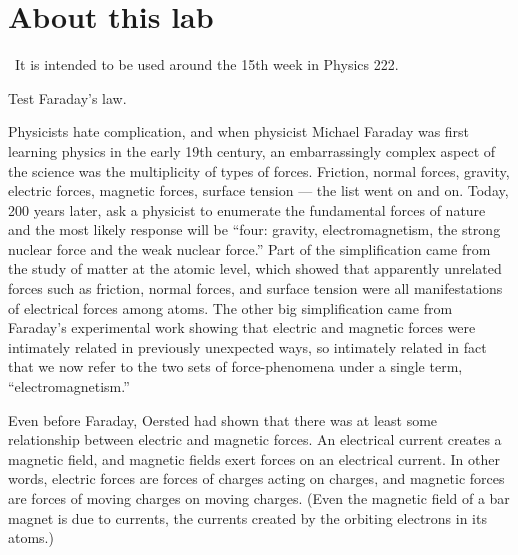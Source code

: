 \renewcommand\thechapter{c2.15}
\label{lab:faraday}

\section*{About this lab}

\covid\ 
It is intended to be used around the 15th week in Physics 222.

\apparatus
{}


\begin{goals}

\item[] Test Faraday's law.
\end{goals}

\introduction

Physicists hate complication, and when physicist Mi\-ch\-a\-el
Faraday was first learning physics in the early 19th
century, an embarrassingly complex aspect of the science was
the multiplicity of types of forces. Friction, normal
forces, gravity, electric forces, magnetic forces, surface
tension --- the list went on and on. Today, 200 years later,
ask a physicist to enumerate the fundamental forces of
nature and the most likely response will be ``four: gravity,
electromagnetism, the strong nuclear force and the weak
nuclear force.'' Part of the simplification came from the
study of matter at the atomic level, which showed that
apparently unrelated forces such as friction, normal forces,
and surface tension were all manifestations of electrical
forces among atoms. The other big simplification came from
Faraday's experimental work showing that electric and
magnetic forces were intimately related in previously
unexpected ways, so intimately related in fact that we now
refer to the two sets of force-phenomena under a single
term, ``electromagnetism.''

Even before Faraday, Oersted had shown that there was at
least some relationship between electric and magnetic
forces. An electrical current creates a magnetic field, and
magnetic fields exert forces on an electrical current. In
other words, electric forces are forces of charges acting on
charges, and magnetic forces are forces of moving charges on
moving charges. (Even the magnetic field of a bar magnet is
due to currents, the currents created by the orbiting
electrons in its atoms.)

